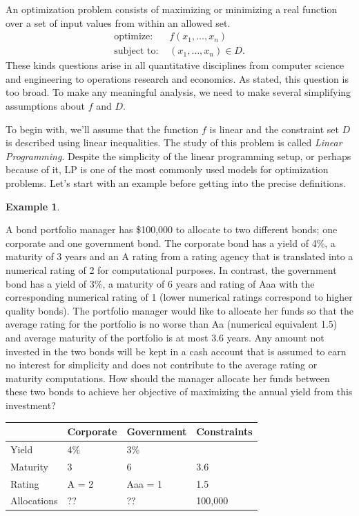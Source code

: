 \documentclass[
]{book}
\theoremstyle{definition}
\theoremstyle{definition}
\newtheorem{example}{Example}[chapter]
\theoremstyle{definition}
\theoremstyle{definition}
\theoremstyle{remark}
\begin{document}
An optimization problem consists of maximizing or minimizing a real function over a set of input values from within an allowed set.
\begin{align*}
\mbox{optimize: } & f(x_1, \dots, x_n) \\
\mbox{subject to: } & (x_1, \dots, x_n) \in D.
\end{align*}
These kinds questions arise in all quantitative disciplines from computer science and engineering to operations research and economics.
As stated, this question is too broad.
To make any meaningful analysis, we need to make several simplifying assumptions about \(f\) and \(D\).

To begin with, we'll assume that the function \(f\) is linear and the constraint set \(D\) is described using linear inequalities. The study of this problem is called \emph{Linear Programming}. Despite the simplicity of the linear programming setup, or perhaps because of it, LP is one of the most commonly used models for optimization problems. Let's start with an example before getting into the precise definitions.

\begin{example}
\protect\hypertarget{exm:bond-portfolio}{}\label{exm:bond-portfolio}

A bond portfolio manager has \$100,000 to allocate to two different bonds; one corporate and one government bond.
The corporate bond has a yield of 4\%, a maturity of 3 years and an A rating from a rating agency that is translated into a numerical rating of 2 for computational purposes.
In contrast, the government bond has a yield of 3\%, a maturity of 6 years and rating of Aaa with the corresponding numerical rating of 1 (lower numerical ratings correspond to higher quality bonds). The portfolio manager would like to allocate her funds so that the average rating for the portfolio is no worse than Aa (numerical equivalent 1.5) and average maturity of the portfolio is at most 3.6 years.
Any amount not invested in the two bonds will be kept in a cash account that is assumed to earn no interest for simplicity and does not contribute to the average rating or maturity computations.
How should the manager allocate her funds between these two bonds to achieve her objective of maximizing the annual yield from this investment? \citep{optimization-methods-in-finance}

\begin{longtable}[]{@{}llll@{}}
\toprule()
& Corporate & Government & Constraints \\
\midrule()
\endhead
Yield & 4\% & 3\% & \\
Maturity & 3 & 6 & 3.6 \\
Rating & A = 2 & Aaa = 1 & 1.5 \\
Allocations & ?? & ?? & 100,000 \\
\bottomrule()
\end{longtable}

\end{example}
\end{document}
